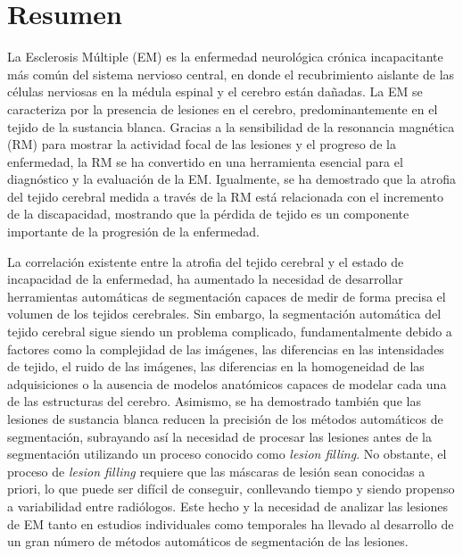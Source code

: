 \chapter*{Resumen}


La Esclerosis Múltiple (EM) es la enfermedad neurológica crónica incapacitante más común del sistema nervioso central, en donde el recubrimiento aislante de las células nerviosas en la médula espinal y el cerebro están dañadas. La EM se caracteriza por la presencia de lesiones en el cerebro, predominantemente en el tejido de la sustancia blanca. Gracias a la sensibilidad de la resonancia magnética (RM) para mostrar la actividad focal de las lesiones y el progreso de la enfermedad, la RM se ha convertido en una herramienta esencial para el diagnóstico y la evaluación de la EM. Igualmente, se ha demostrado que la atrofia del tejido cerebral medida a través de la RM está relacionada con el incremento de la discapacidad, mostrando que la pérdida de tejido es un componente importante de la progresión de la enfermedad.

La correlación existente entre la atrofia del tejido cerebral y el estado de incapacidad de la enfermedad, ha aumentado la necesidad de desarrollar 
herramientas automáticas de segmentación capaces de medir de forma precisa el volumen de los tejidos cerebrales. Sin embargo, la segmentación automática del tejido cerebral sigue siendo un problema complicado, fundamentalmente debido a factores como la complejidad de las imágenes, las diferencias en las intensidades de tejido, el ruido de las imágenes, las diferencias en la homogeneidad de las adquisiciones o la ausencia de modelos anatómicos capaces de modelar cada una de las estructuras del cerebro. Asimismo, se ha demostrado también que las lesiones de sustancia blanca reducen la precisión de los métodos automáticos de segmentación, subrayando así la necesidad de procesar las lesiones antes de la segmentación utilizando un proceso conocido como \textit{lesion filling}. No obstante, el proceso de \textit{lesion filling} requiere que las máscaras de lesión sean conocidas a priori, lo que puede ser difícil de conseguir, conllevando tiempo y siendo propenso a variabilidad entre radiólogos. Este hecho y la necesidad de analizar las lesiones de EM tanto en estudios individuales como temporales ha llevado al desarrollo de un 
gran número de métodos automáticos de segmentación de las lesiones. 

